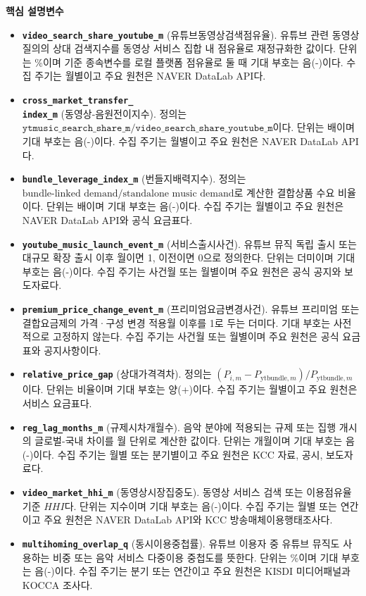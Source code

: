 \documentclass[11pt,a4paper]{report}
\newenvironment{summarylist}{\begin{itemize}[leftmargin=1.8em,itemsep=0.35em,topsep=0.35em]\RaggedRight}{\end{itemize}}
\begin{document}
\noindent\textbf{핵심 설명변수}
\begin{summarylist}
  \item \textbf{\nolinkurl{video_search_share_youtube_m}} (유튜브동영상검색점유율). 유튜브 관련 동영상 질의의 상대 검색지수를 동영상 서비스 집합 내 점유율로 재정규화한 값이다. 단위는 \%이며 기준 종속변수를 로컬 플랫폼 점유율로 둘 때 기대 부호는 음(-)이다. 수집 주기는 월별이고 주요 원천은 NAVER DataLab API다.
  \item \textbf{\texttt{cross\_market\_transfer\_}\\\texttt{index\_m}} (동영상-음원전이지수). 정의는 $\texttt{ytmusic\_search\_share\_m} / \texttt{video\_search\_share\_youtube\_m}$이다. 단위는 배이며 기대 부호는 음(-)이다. 수집 주기는 월별이고 주요 원천은 NAVER DataLab API다.
  \item \textbf{\texttt{bundle\_leverage\_index\_m}} (번들지배력지수). 정의는 $\text{bundle-linked demand}/\text{standalone music demand}$로 계산한 결합상품 수요 비율이다. 단위는 배이며 기대 부호는 음(-)이다. 수집 주기는 월별이고 주요 원천은 NAVER DataLab API와 공식 요금표다.
  \item \textbf{\nolinkurl{youtube_music_launch_event_m}} (서비스출시사건). 유튜브 뮤직 독립 출시 또는 대규모 확장 출시 이후 월이면 1, 이전이면 0으로 정의한다. 단위는 더미이며 기대 부호는 음(-)이다. 수집 주기는 사건월 또는 월별이며 주요 원천은 공식 공지와 보도자료다.
  \item \textbf{\nolinkurl{premium_price_change_event_m}} (프리미엄요금변경사건). 유튜브 프리미엄 또는 결합요금제의 가격·구성 변경 적용월 이후를 1로 두는 더미다. 기대 부호는 사전적으로 고정하지 않는다. 수집 주기는 사건월 또는 월별이며 주요 원천은 공식 요금표와 공지사항이다.
  \item \textbf{\texttt{relative\_price\_gap}} (상대가격격차). 정의는 $(P_{i,m}-P_{\mathrm{ytbundle},m})/P_{\mathrm{ytbundle},m}$이다. 단위는 비율이며 기대 부호는 양(+)이다. 수집 주기는 월별이고 주요 원천은 서비스 요금표다.
  \item \textbf{\texttt{reg\_lag\_months\_m}} (규제시차개월수). 음악 분야에 적용되는 규제 또는 집행 개시의 글로벌-국내 차이를 월 단위로 계산한 값이다. 단위는 개월이며 기대 부호는 음(-)이다. 수집 주기는 월별 또는 분기별이고 주요 원천은 KCC 자료, 공시, 보도자료다.
  \item \textbf{\texttt{video\_market\_hhi\_m}} (동영상시장집중도). 동영상 서비스 검색 또는 이용점유율 기준 $HHI$다. 단위는 지수이며 기대 부호는 음(-)이다. 수집 주기는 월별 또는 연간이고 주요 원천은 NAVER DataLab API와 KCC 방송매체이용행태조사다.
  \item \textbf{\texttt{multihoming\_overlap\_q}} (동시이용중첩률). 유튜브 이용자 중 유튜브 뮤직도 사용하는 비중 또는 음악 서비스 다중이용 중첩도를 뜻한다. 단위는 \%이며 기대 부호는 음(-)이다. 수집 주기는 분기 또는 연간이고 주요 원천은 KISDI 미디어패널과 KOCCA 조사다.
\end{summarylist}
\end{document}
